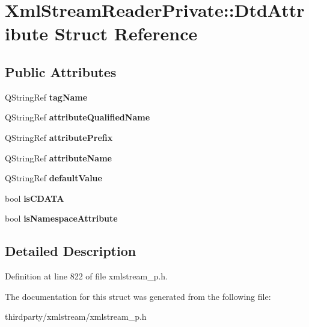 \hypertarget{struct_xml_stream_reader_private_1_1_dtd_attribute}{}\section{Xml\+Stream\+Reader\+Private\+:\+:Dtd\+Attribute Struct Reference}
\label{struct_xml_stream_reader_private_1_1_dtd_attribute}
\subsection*{Public Attributes}
\begin{DoxyCompactItemize}
\item 
\mbox{\label{struct_xml_stream_reader_private_1_1_dtd_attribute_af2045383ed3707568a2fc5a977b4becd}} 
Q\+String\+Ref {\bfseries tag\+Name}
\item 
\mbox{\label{struct_xml_stream_reader_private_1_1_dtd_attribute_a4a647e79e880805401d7ba55569fc98c}} 
Q\+String\+Ref {\bfseries attribute\+Qualified\+Name}
\item 
\mbox{\label{struct_xml_stream_reader_private_1_1_dtd_attribute_a83db1ee33ae28861124f56fb4366e4e1}} 
Q\+String\+Ref {\bfseries attribute\+Prefix}
\item 
\mbox{\label{struct_xml_stream_reader_private_1_1_dtd_attribute_a1e0597c40927193366ddd557cc22c9a7}} 
Q\+String\+Ref {\bfseries attribute\+Name}
\item 
\mbox{\label{struct_xml_stream_reader_private_1_1_dtd_attribute_a326d37ec8ade5078e824c5b8d3e1a812}} 
Q\+String\+Ref {\bfseries default\+Value}
\item 
\mbox{\label{struct_xml_stream_reader_private_1_1_dtd_attribute_a0724b381a76126b2859de58f6b7a38c1}} 
bool {\bfseries is\+C\+D\+A\+TA}
\item 
\mbox{\label{struct_xml_stream_reader_private_1_1_dtd_attribute_a3cd1ec15e20e8802c3d2f8682d897c5f}} 
bool {\bfseries is\+Namespace\+Attribute}
\end{DoxyCompactItemize}


\subsection{Detailed Description}


Definition at line 822 of file xmlstream\+\_\+p.\+h.



The documentation for this struct was generated from the following file\+:\begin{DoxyCompactItemize}
\item 
thirdparty/xmlstream/xmlstream\+\_\+p.\+h\end{DoxyCompactItemize}
